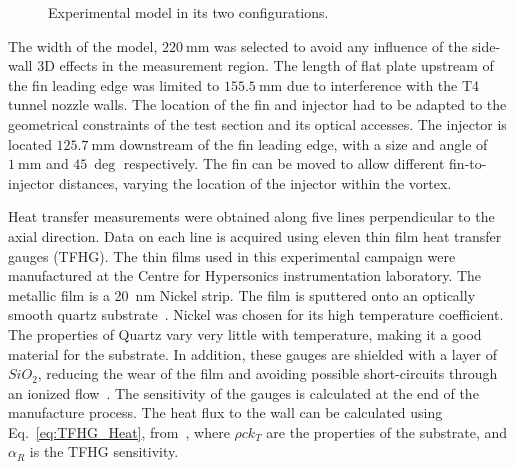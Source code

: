 \documentclass{AIAA}
\begin{document}
%
\begin{figure}[!h]
\center
{}
\caption{Experimental model in its two configurations.}
\label{fig:ModelPics}
\end{figure} 

The width of the model, $\SI{220}{\milli\meter}$ was selected to avoid any influence of the side-wall 3D effects in the measurement region.
The length of flat plate upstream of the fin leading edge was limited to $\SI{155.5}{\milli\meter}$ due to interference with the T4 tunnel nozzle walls.
The location of the fin and injector had to be adapted to the geometrical constraints of the test section and its optical accesses.
The injector is located $\SI{125.7}{\milli\meter}$ downstream of the fin leading edge, with a size and angle of $\SI{1}{\milli\meter}$ and $\SI{45}{\deg}$ respectively.
The fin can be moved to allow different fin-to-injector distances, varying the location of the injector within the vortex. 
 
Heat transfer measurements were obtained along five lines perpendicular to the axial direction.
Data on each line is acquired using eleven thin film heat transfer gauges (TFHG).
The thin films used in this experimental campaign were manufactured at the Centre for Hypersonics instrumentation laboratory.
The metallic film is a \SI{20}{\nano\meter} Nickel strip.
The film is sputtered onto an optically smooth quartz substrate~\cite{Wise_Thesis}.
Nickel was chosen for its high temperature coefficient.
The properties of Quartz vary very little with temperature, making it a good material for the substrate.
In addition, these gauges are shielded with a layer of $SiO_2$, reducing the wear of the film and avoiding possible short-circuits through an ionized flow~\cite{Wise_Thesis}.
The sensitivity of the gauges is calculated at the end of the manufacture process.
The heat flux to the wall can be calculated using Eq.~\ref{eq:TFHG_Heat}, from~\cite{Wise_Thesis,Schultz_Book}, where $\rho c k_T$ are the properties of the substrate, and $\alpha_R$ is the TFHG sensitivity.
\end{document}
